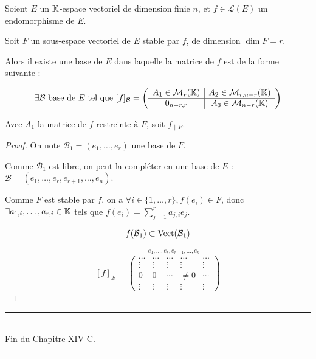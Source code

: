 \documentclass[12pt, a4paper]{report}
\begin{document}
\begin{property}
    Soient $E$ un $\mathbb{K}$-espace vectoriel de dimension finie $n$, et $f \in \mathcal L(E)$ un endomorphisme de $E$.

    Soit $F$ un sous-espace vectoriel de $E$ stable par $f$, de dimension $\dim F = r$.

    Alors il existe une base de $E$ dans laquelle la matrice de $f$ est de la forme suivante :

    $$\exists \mathcal B \text{ base de } E \text{ tel que } [f]_\mathcal{B} = 
    \left(
    \begin{array}{c|c}
    A_1 \in \mathcal{M}_{r}(\mathbb{K}) & A_2 \in \mathcal{M}_{r,n-r}(\mathbb{K}) \\
    \hline
    0_{n-r,r} & A_3 \in \mathcal{M}_{n-r}(\mathbb{K})
    \end{array}
    \right)
    $$

    Avec $A_1$ la matrice de $f$ restreinte à $F$, soit $f_{\parallel F}$.
\end{property}

\begin{proof}
    On note $\mathcal B_1 = (e_1,\dots,e_r)$ une base de $F$.

    Comme $\mathcal B_1$ est libre, on peut la compléter en une base de $E$ : $\mathcal B = (e_1,\dots,e_r,e_{r+1},\dots,e_n)$.

    Comme $F$ est stable par $f$, on a $\forall i \in \{1,\dots,r\}, f(e_i) \in F$, donc $\exists a_{1,i},\dots,a_{r,i} \in \mathbb{K}$ tels que $f(e_i) = \sum_{j=1}^r a_{j,i} e_j$.

    $$f(\mathcal B_1) \subset \mathrm{Vect}(\mathcal B_1)$$

    $$[f]_\mathcal{B} = \overset{e_1,\dots,e_r,e_{r+1},\dots,e_n}{\left(\begin{matrix}
    \dots & \dots & \dots & \dots & \dots \\
    \vdots & \vdots & \vdots & \vdots & \vdots \\
    0 & 0 & \cdots & \ne 0 & \cdots \\
    \vdots & \vdots & \vdots & \vdots & \vdots
    \end{matrix}\right)}$$
\end{proof}

\begin{center}
    \rule{0.5\textwidth}{1pt}\\
    Fin du Chapitre XIV-C.\\
    \rule{0.5\textwidth}{1pt}
\end{center}

\printindex
\end{document}
